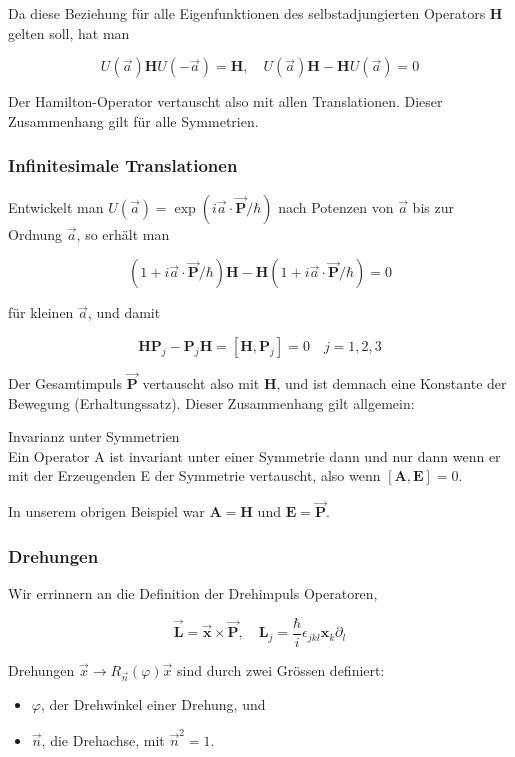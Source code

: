 \documentclass[10pt, letterpaper]{article}
\begin{document}
Da diese Beziehung für alle Eigenfunktionen des selbstadjungierten Operators $\mathbf{H}$ gelten soll, hat man

$$
U(\vec{a}) \mathbf{H} U(-\vec{a})=\mathbf{H}, \quad U(\vec{a}) \mathbf{H}-\mathbf{H} U(\vec{a})=0
$$

Der Hamilton-Operator vertauscht also mit allen Translationen. Dieser Zusammenhang gilt für alle Symmetrien.

\subsubsection*{Infinitesimale Translationen}
Entwickelt man $U(\vec{a})=\exp (i \vec{a} \cdot \overrightarrow{\mathbf{P}} / \hbar)$ nach Potenzen von $\vec{a}$ bis zur Ordnung $\vec{a}$, so erhält man

$$
(1+i \vec{a} \cdot \overrightarrow{\mathbf{P}} / \hbar) \mathbf{H}-\mathbf{H}(1+i \vec{a} \cdot \overrightarrow{\mathbf{P}} / \hbar)=0
$$

für kleinen $\vec{a}$, und damit

$$
\mathbf{H} \mathbf{P}_{j}-\mathbf{P}_{j} \mathbf{H}=\left[\mathbf{H}, \mathbf{P}_{j}\right]=0 \quad j=1,2,3
$$

Der Gesamtimpuls $\overrightarrow{\mathbf{P}}$ vertauscht also mit $\mathbf{H}$, und ist demnach eine Konstante der Bewegung (Erhaltungssatz). Dieser Zusammenhang gilt allgemein:

Invarianz unter Symmetrien\\
Ein Operator A ist invariant unter einer Symmetrie dann und nur dann wenn er mit der Erzeugenden E der Symmetrie vertauscht, also wenn $[\mathbf{A}, \mathbf{E}]=0$.

In unserem obrigen Beispiel war $\mathbf{A}=\mathbf{H}$ und $\mathbf{E}=\overrightarrow{\mathbf{P}}$.

\subsubsection*{Drehungen}
Wir errinnern an die Definition der Drehimpuls Operatoren,

$$
\overrightarrow{\mathbf{L}}=\overrightarrow{\mathbf{x}} \times \overrightarrow{\mathbf{P}}, \quad \mathbf{L}_{j}=\frac{\hbar}{i} \epsilon_{j k l} \mathbf{x}_{k} \partial_{l}
$$

Drehungen $\vec{x} \rightarrow R_{\vec{n}}(\varphi) \vec{x}$ sind durch zwei Grössen definiert:

\begin{itemize}
  \item $\varphi$, der Drehwinkel einer Drehung, und
  \item $\vec{n}$, die Drehachse, mit $\vec{n}^{2}=1$.
\end{itemize}
\end{document}
